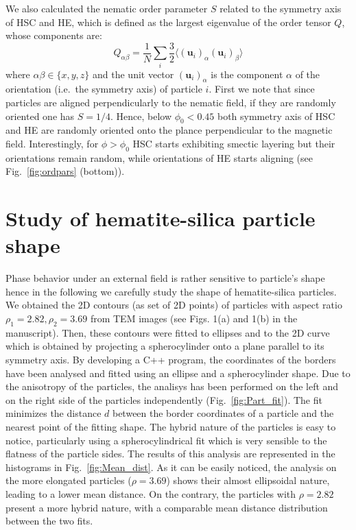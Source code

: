 \documentclass[aip,graphicx]{revtex4-1} %
\begin{document}
We also calculated the nematic order parameter $S$ related to the symmetry axis of HSC and HE, which
is defined as the largest eigenvalue of the order tensor $Q$, whose components are:
\begin{equation}
  Q_{\alpha\beta} = \frac{1}{N} \sum_i \frac{3}{2} \langle {(\mathbf{u}_i)}_\alpha {(\mathbf{u}_i)}_\beta\rangle
\label{eq:nemop}
\end{equation}
where $\alpha\beta\in\{x,y,z\}$ and the unit vector ${(\mathbf{u}_i)}_\alpha$ is the component $\alpha$ of the orientation (i.e.~the symmetry axis) of particle $i$.
First we note that since particles are aligned perpendicularly to the nematic field, if they are 
randomly oriented one has $S=1/4$. Hence, below $\phi_0 < 0.45$ both symmetry axis of HSC and HE are 
randomly oriented onto the plance perpendicular to the magnetic field.
Interestingly, for $\phi > \phi_0$ HSC starts exhibiting smectic layering but their orientations
remain random, while orientations of HE starts aligning (see Fig.~\ref{fig:ordpars} (bottom)).

\section{Study of hematite-silica particle shape}
Phase behavior under an external field is rather sensitive to particle's shape hence in the following
we carefully study the shape of hematite-silica particles.
We obtained the 2D contours (as set of 2D points) of particles with aspect ratio $\rho_1 = 2.82, \rho_2 = 3.69$ from TEM images 
(see Figs. 1(a) and 1(b) in the manuscript).
Then, these contours were fitted to ellipses and to the 2D curve which is obtained by projecting a spherocylinder onto a plane parallel
to its symmetry axis.
By developing a C++ program, the coordinates of the borders have been analysed and
fitted using an ellipse and a spherocylinder shape. Due to the anisotropy of the particles, the analisys has been performed on the left and on the right side of
the particles independently (Fig.~\ref{fig:Part_fit}). The fit minimizes the distance $d$ between the border coordinates of a particle and the nearest point of
the fitting shape. The hybrid nature of the particles is easy to notice, particularly using a spherocylindrical fit which is very sensible to the flatness of
the particle sides. The results of this analysis are represented in the histograms in Fig.~\ref{fig:Mean_dist}. As it can be easily noticed, the analysis on the
more elongated particles ($\rho = 3.69$) shows their almost ellipsoidal nature, leading to a lower mean distance. On the contrary, the particles with $\rho =
2.82$ present a more hybrid nature, with a comparable mean distance distribution between the two fits.
\end{document}
